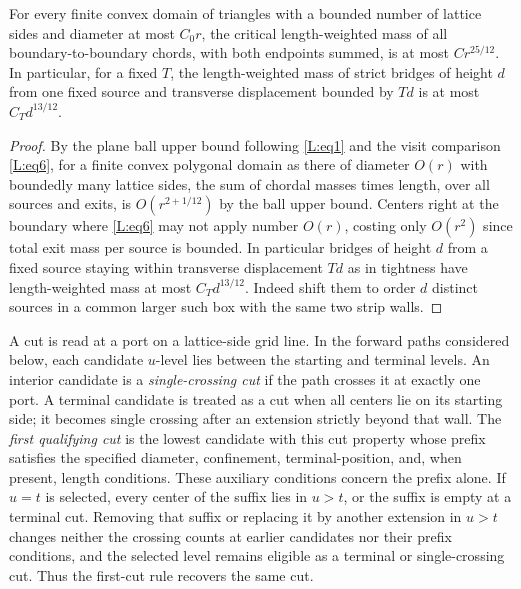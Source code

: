 \begin{proposition}\label{L:prop:box-moment}
For every finite convex domain of triangles with a bounded number of
lattice sides and diameter at most $C_0r$, the critical length-weighted
mass of all boundary-to-boundary chords, with both endpoints summed, is
at most $C r^{25/12}$. In particular, for a fixed $T$, the length-weighted
mass of strict bridges of height $d$ from one fixed source and transverse
displacement bounded by $Td$ is at most $C_Td^{13/12}$.
\end{proposition}
\begin{proof}
By the plane ball upper bound following \eqref{L:eq1} and the visit comparison \eqref{L:eq6}, for a finite convex polygonal domain as there of diameter \(O(r)\) with boundedly many lattice sides, the sum of chordal masses times length, over all sources and exits, is \(O(r^{2+1/12})\) by the ball upper bound. Centers right at the boundary where \eqref{L:eq6} may not apply number \(O(r)\), costing only \(O(r^2)\) since total exit mass per source is bounded. In particular bridges of height \(d\) from a fixed source staying within transverse displacement \(Td\) as in tightness have length-weighted mass at most \(C_T d^{13/12}\). Indeed shift them to order \(d\) distinct sources in a common larger such box with the same two strip walls.
\end{proof}

A cut is read at a port on a lattice-side grid line. In the forward
paths considered below, each candidate \(u\)-level lies between the
starting and terminal levels. An interior candidate is a
\emph{single-crossing cut} if the path crosses it at exactly one port.
A terminal candidate is treated as a cut when all centers lie on its
starting side; it becomes single crossing after an extension strictly
beyond that wall. The \emph{first qualifying cut} is the lowest candidate
with this cut property whose prefix satisfies the specified diameter,
confinement, terminal-position, and, when present, length conditions.
These auxiliary conditions concern the prefix alone. If \(u=t\) is
selected, every center of the suffix lies in \(u>t\), or the suffix is
empty at a terminal cut. Removing that suffix or replacing it by another
extension in \(u>t\) changes neither the crossing counts at earlier
candidates nor their prefix conditions, and the selected level remains
eligible as a terminal or single-crossing cut. Thus the first-cut rule
recovers the same cut.

